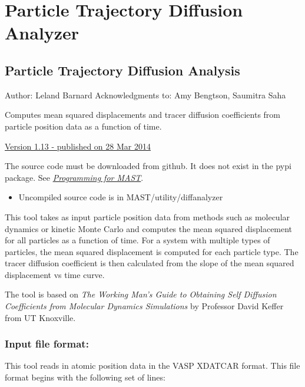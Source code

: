 \documentclass[letterpaper,10pt,english]{sphinxmanual}
\begin{document}
\section{Particle Trajectory Diffusion Analyzer}
\label{8_0_standalonetools:particle-trajectory-diffusion-analyzer}

\subsection{Particle Trajectory Diffusion Analysis}
\label{8_0_3_diffanalyzer:particle-trajectory-diffusion-analysis}\label{8_0_3_diffanalyzer::doc}
Author: Leland Barnard
Acknowledgments to: Amy Bengtson, Saumitra Saha

Computes mean squared displacements and tracer diffusion coefficients from particle position data as a function of time.

\href{https://materialshub.org/resources/diffanalyzer}{Version 1.13 - published on 28 Mar 2014}

The source code must be downloaded from github. It does not exist in the pypi package. See {\hyperref[12_0_programming::doc]{\emph{Programming for MAST}}}.
\begin{itemize}
\item {} 
Uncompiled source code is in MAST/utility/diffanalyzer

\end{itemize}

This tool takes as input particle position data from methods such as molecular dynamics or kinetic Monte Carlo and computes the mean squared displacement for all particles as a function of time.
For a system with multiple types of particles, the mean squared displacement is computed for each particle type.
The tracer diffusion coefficient is then calculated from the slope of the mean squared displacement vs time curve.

The tool is based on \emph{The Working Man's Guide to Obtaining Self Diffusion Coefficients from Molecular Dynamics Simulations} by Professor David Keffer from UT Knoxville.


\subsubsection{Input file format:}
\label{8_0_3_diffanalyzer:input-file-format}
This tool reads in atomic position data in the VASP XDATCAR format. This file format begins with the following set of lines:
\end{document}
